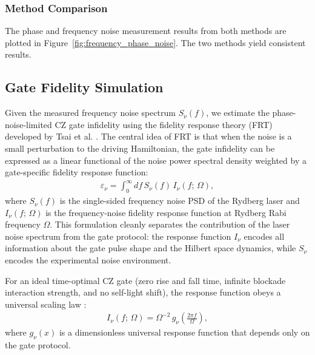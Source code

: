 \documentclass[11pt]{report}
\begin{document}
\subsubsection{Method Comparison}
The phase and frequency noise measurement results from both methods are plotted in Figure~\ref{fig:frequency_phase_noise}.  The two methods yield consistent results. 

\subsection{Gate Fidelity Simulation}

Given the measured frequency noise spectrum $S_\nu(f)$, we estimate the phase-noise-limited CZ gate infidelity using the fidelity response theory (FRT) developed by Tsai et al. \cite{Tsai2025}. The central idea of FRT is that when the noise is a small perturbation to the driving Hamiltonian, the gate infidelity can be expressed as a linear functional of the noise power spectral density weighted by a gate-specific fidelity response function:
\begin{align}
    \varepsilon_\nu = \int_0^\infty df\, S_\nu(f)\, I_\nu(f;\,\Omega), \label{eqn:FRT_integral}
\end{align}
where $S_\nu(f)$ is the single-sided frequency noise PSD of the Rydberg laser and $I_\nu(f;\,\Omega)$ is the frequency-noise fidelity response function at Rydberg Rabi frequency $\Omega$. This formulation cleanly separates the contribution of the laser noise spectrum from the gate protocol: the response function $I_\nu$ encodes all information about the gate pulse shape and the Hilbert space dynamics, while $S_\nu$ encodes the experimental noise environment.

For an ideal time-optimal CZ gate (zero rise and fall time, infinite blockade interaction strength, and no self-light shift), the response function obeys a universal scaling law \cite{Tsai2025}:
\begin{align}
    I_\nu(f;\,\Omega) = \Omega^{-2}\, g_\nu\!\left(\frac{2\pi f}{\Omega}\right), \label{eqn:scaling_law}
\end{align}
where $g_\nu(x)$ is a dimensionless universal response function that depends only on the gate protocol. 


\end{document}

